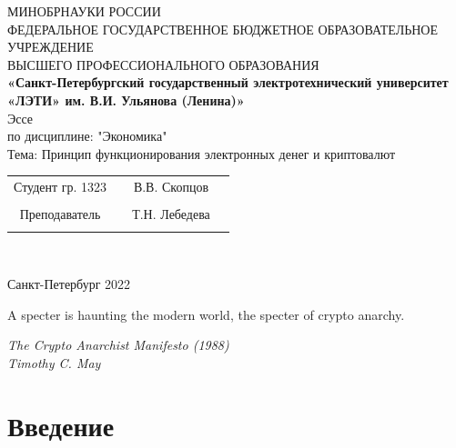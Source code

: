 \documentclass[12pt,a4paper]{article}
\begin{document}
\begin{center}
\hfill \break
\large{МИНОБРНАУКИ РОССИИ}\\
\footnotesize{ФЕДЕРАЛЬНОЕ ГОСУДАРСТВЕННОЕ БЮДЖЕТНОЕ ОБРАЗОВАТЕЛЬНОЕ УЧРЕЖДЕНИЕ}\\ 
\footnotesize{ВЫСШЕГО ПРОФЕССИОНАЛЬНОГО ОБРАЗОВАНИЯ}\\
\small{\textbf{«Санкт-Петербургский государственный
электротехнический университет
	«ЛЭТИ» им. В.И. Ульянова (Ленина)»}}\\
\hfill \break
\hfill \break
 \hfill \break
\hfill\break
\hfill \break
\hfill \break
\hfill \break
\large{Эссе \\

\hfill \break
	по дисциплине: "Экономика"\\
\hfill \break
	Тема: Принцип функционирования электронных денег и криптовалют}\\
\hfill \break
\hfill \break
\hfill \break
\hfill \break
\end{center}
 
\hfill \break
\hfill \break
\hfill \break
\hfill \break
\hfill \break
\hfill \break
\hfill \break
\hfill \break
\hfill \break
\hfill \break
\hfill \break
\hfill \break
\hfill \break
\hfill \break
 
\normalsize{ 
\begin{tabular}{cccc}
Студент гр. 1323 & \underline{\hspace{3cm}} & В.В. Скопцов \\\\
Преподаватель & \underline{\hspace{3cm}} & Т.Н. Лебедева \\\\
\end{tabular}
}\\
\hfill \break
\hfill \break
\begin{center}
	Санкт-Петербург 2022
\end{center}
\thispagestyle{empty} %
 
\newpage 

\tableofcontents

\newpage


\epigraph{A specter is haunting the modern world, the specter of crypto anarchy.}
{\textit{The Crypto Anarchist Manifesto (1988)\\Timothy C. May}}

\section{Введение}
\end{document}
